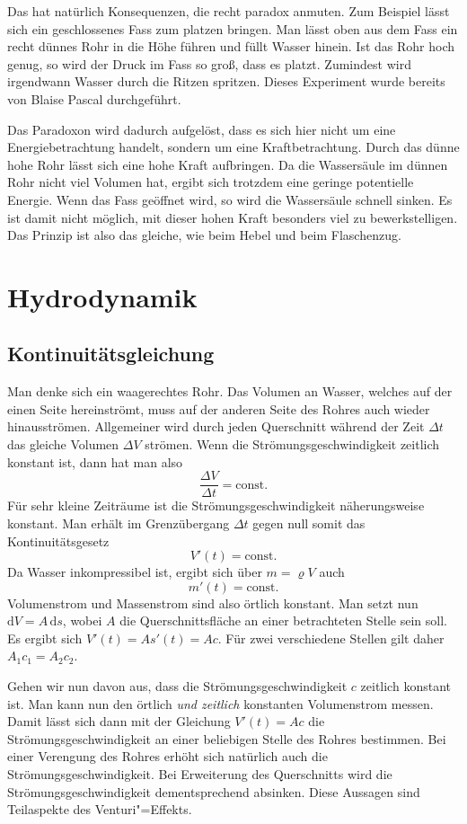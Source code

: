 \documentclass[a4paper,11pt,fleqn,twocolumn,twoside,dvipdfmx]{scrartcl}
\begin{document}
Das hat natürlich Konsequenzen, die recht paradox anmuten.
Zum Beispiel lässt sich ein geschlossenes Fass zum platzen bringen.
Man lässt oben aus dem Fass ein recht dünnes Rohr in die Höhe führen
und füllt Wasser hinein. Ist das Rohr hoch genug, so wird der Druck
im Fass so groß, dass es platzt. Zumindest wird irgendwann Wasser
durch die Ritzen spritzen. Dieses Experiment wurde bereits von
Blaise Pascal durchgeführt.

Das Paradoxon wird dadurch aufgelöst, dass es sich hier nicht um
eine Energiebetrachtung handelt, sondern um eine Kraftbetrachtung.
Durch das dünne hohe Rohr lässt sich eine hohe Kraft aufbringen.
Da die Wassersäule im dünnen Rohr nicht viel Volumen hat, ergibt sich
trotzdem eine geringe potentielle Energie. Wenn das Fass geöffnet
wird, so wird die Wassersäule schnell sinken. Es ist damit nicht
möglich, mit dieser hohen Kraft besonders viel zu bewerkstelligen.
Das Prinzip ist also das gleiche, wie beim Hebel und beim Flaschenzug.

\section{Hydrodynamik}
\subsection{Kontinuitätsgleichung}
Man denke sich ein waagerechtes Rohr. Das Volumen an Wasser, welches
auf der einen Seite hereinströmt, muss auf der anderen Seite des
Rohres auch wieder hinausströmen. Allgemeiner wird durch jeden
Querschnitt während der Zeit $\Delta t$ das gleiche Volumen
$\Delta V$ strömen. Wenn die Strömungsgeschwindigkeit zeitlich
konstant ist, dann hat man also%
\[\frac{\Delta V}{\Delta t} = \mathrm{const.}\]
Für sehr kleine Zeiträume ist die Strömungsgeschwindigkeit
näherungsweise konstant. Man erhält im Grenzübergang $\Delta t$
gegen null somit das Kontinuitätsgesetz%
\[V'(t) = \mathrm{const.}\]
Da Wasser inkompressibel ist, ergibt sich über $m=\varrho V$ auch%
\[m'(t) = \mathrm{const.}\]
Volumenstrom und Massenstrom sind also örtlich konstant.
Man setzt nun $\mathrm dV=A\,\mathrm ds$, wobei $A$ die
Querschnittsfläche an einer betrachteten Stelle sein soll.
Es ergibt sich $V'(t) = As'(t) = Ac$. Für zwei verschiedene
Stellen gilt daher $A_1c_1 = A_2c_2$.

Gehen wir nun davon aus, dass die Strömungsgeschwindigkeit $c$
zeitlich konstant ist. Man kann nun den örtlich \textit{und zeitlich}
konstanten Volumenstrom messen. Damit lässt sich dann mit der
Gleichung $V'(t) = Ac$ die Strömungsgeschwindigkeit an einer
beliebigen Stelle des Rohres bestimmen. Bei einer Verengung des
Rohres erhöht sich natürlich auch die Strömungsgeschwindigkeit.
Bei Erweiterung des Querschnitts wird die Strömungsgeschwindigkeit
dementsprechend absinken. Diese Aussagen sind Teilaspekte des
Venturi"=Effekts.
\end{document}

